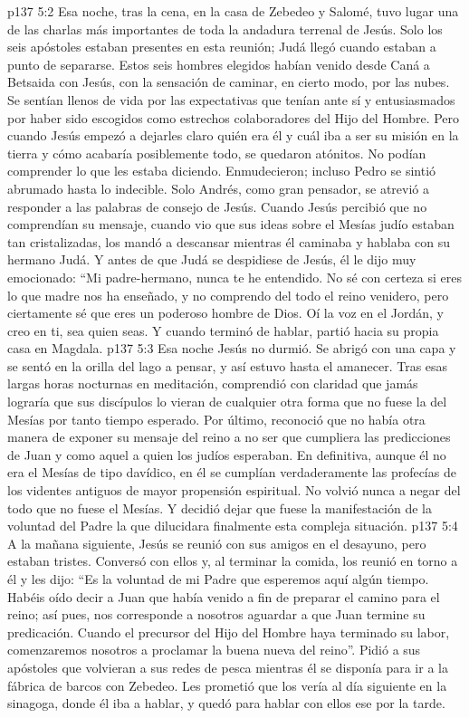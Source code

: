 \vs p137 5:2 Esa noche, tras la cena, en la casa de Zebedeo y Salomé, tuvo lugar una de las charlas más importantes de toda la andadura terrenal de Jesús. Solo los seis apóstoles estaban presentes en esta reunión; Judá llegó cuando estaban a punto de separarse. Estos seis hombres elegidos habían venido desde Caná a Betsaida con Jesús, con la sensación de caminar, en cierto modo, por las nubes. Se sentían llenos de vida por las expectativas que tenían ante sí y entusiasmados por haber sido escogidos como estrechos colaboradores del Hijo del Hombre. Pero cuando Jesús empezó a dejarles claro quién era él y cuál iba a ser su misión en la tierra y cómo acabaría posiblemente todo, se quedaron atónitos. No podían comprender lo que les estaba diciendo. Enmudecieron; incluso Pedro se sintió abrumado hasta lo indecible. Solo Andrés, como gran pensador, se atrevió a responder a las palabras de consejo de Jesús. Cuando Jesús percibió que no comprendían su mensaje, cuando vio que sus ideas sobre el Mesías judío estaban tan cristalizadas, los mandó a descansar mientras él caminaba y hablaba con su hermano Judá. Y antes de que Judá se despidiese de Jesús, él le dijo muy emocionado: “Mi padre\hyp{}hermano, nunca te he entendido. No sé con certeza si eres lo que madre nos ha enseñado, y no comprendo del todo el reino venidero, pero ciertamente sé que eres un poderoso hombre de Dios. Oí la voz en el Jordán, y creo en ti, sea quien seas. Y cuando terminó de hablar, partió hacia su propia casa en Magdala.
\vs p137 5:3 Esa noche Jesús no durmió. Se abrigó con una capa y se sentó en la orilla del lago a pensar, y así estuvo hasta el amanecer. Tras esas largas horas nocturnas en meditación, comprendió con claridad que jamás lograría que sus discípulos lo vieran de cualquier otra forma que no fuese la del Mesías por tanto tiempo esperado. Por último, reconoció que no había otra manera de exponer su mensaje del reino a no ser que cumpliera las predicciones de Juan y como aquel a quien los judíos esperaban. En definitiva, aunque él no era el Mesías de tipo davídico, en él se cumplían verdaderamente las profecías de los videntes antiguos de mayor propensión espiritual. No volvió nunca a negar del todo que no fuese el Mesías. Y decidió dejar que fuese la manifestación de la voluntad del Padre la que dilucidara finalmente esta compleja situación.
\vs p137 5:4 A la mañana siguiente, Jesús se reunió con sus amigos en el desayuno, pero estaban tristes. Conversó con ellos y, al terminar la comida, los reunió en torno a él y les dijo: “Es la voluntad de mi Padre que esperemos aquí algún tiempo. Habéis oído decir a Juan que había venido a fin de preparar el camino para el reino; así pues, nos corresponde a nosotros aguardar a que Juan termine su predicación. Cuando el precursor del Hijo del Hombre haya terminado su labor, comenzaremos nosotros a proclamar la buena nueva del reino”. Pidió a sus apóstoles que volvieran a sus redes de pesca mientras él se disponía para ir a la fábrica de barcos con Zebedeo. Les prometió que los vería al día siguiente en la sinagoga, donde él iba a hablar, y quedó para hablar con ellos ese  por la tarde.
